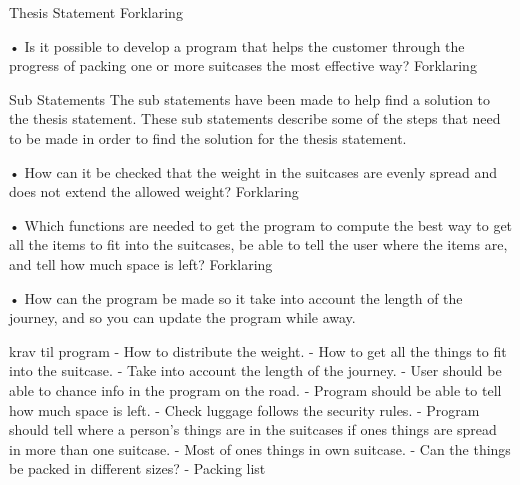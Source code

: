 Thesis Statement
Forklaring 

•	Is it possible to develop a program that helps the customer through the progress of packing one or more suitcases the most effective way?
Forklaring

Sub Statements
The sub statements have been made to help find a solution to the thesis statement. These sub statements describe some of the steps that need to be made in order to find the solution for the thesis statement.

•	How can it be checked that the weight in the suitcases are evenly spread and does not extend the allowed weight?
Forklaring

•	Which functions are needed to get the program to compute the best way to get all the items to fit into the suitcases, be able to tell the user where the items are, and tell how much space is left?
Forklaring

•	How can the program be made so it take into account the length of the journey, and so you can update the program while away.




krav til program
-	How to distribute the weight.
-	How to get all the things to fit into the suitcase.
-	Take into account the length of the journey.
-	User should be able to chance info in the program on the road.
-	Program should be able to tell how much space is left.
-	Check luggage follows the security rules.
-	Program should tell where a person’s things are in the suitcases if ones things are spread in more than one suitcase.
-	Most of ones things in own suitcase.
-	Can the things be packed in different sizes?
-	Packing list


